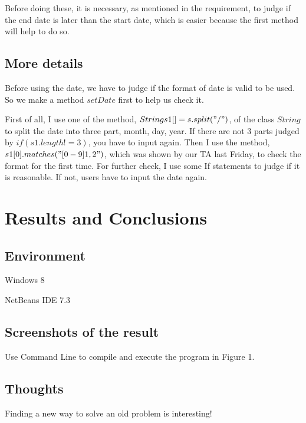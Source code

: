 \documentclass{article}
\begin{document}
Before doing these, it is necessary, as mentioned in the requirement, to judge if the end date is later than the start date, which is easier because the first method will help to do so.

\subsection{More details}
Before using the date, we have to judge if the format of date is valid to be used. So we make a method $setDate$ first to help us check it.

First of all, I use one of the method, $String s1[] = s.split("/")$, of the class $String$ to split the date into three part, month, day, year. If there are not 3 parts judged by $if(s1.length != 3)$, you have to input again. Then I use the method, $s1[0].matches("[0-9]{1,2}")$, which was shown by our TA last Friday, to check the format for the first time. For further check, I use some If statements to judge if it is reasonable. If not, users have to input the date again.


\section{Results and Conclusions}
\subsection{Environment}
\begin{compactitem}
\item Windows 8
\item NetBeans IDE 7.3
\end{compactitem}
\subsection{Screenshots of the result}
Use Command Line to compile and execute the program in Figure 1.

\subsection{Thoughts}
Finding a new way to solve an old problem is interesting!

\end{document}
